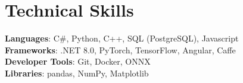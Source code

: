 \documentclass[letterpaper,11pt]{article}
\begin{document}
%
\section{Technical Skills}
 \begin{itemize}[leftmargin=0.15in, label={}]
    \small{\item{
     \textbf{Languages}{: C\#, Python, C++, SQL (PostgreSQL), Javascript} \\
     \textbf{Frameworks}{: .NET 8.0, PyTorch, TensorFlow, Angular, Caffe} \\
     \textbf{Developer Tools}{: Git, Docker, ONNX} \\
     \textbf{Libraries}{: pandas, NumPy, Matplotlib}
    }}
 \end{itemize}


\end{document}
